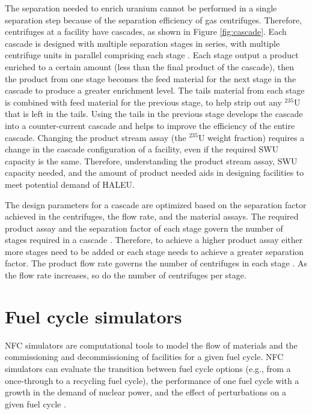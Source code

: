 The separation needed to enrich uranium cannot be performed 
in a single 
separation step because of the separation efficiency of gas centrifuges. 
Therefore, centrifuges at a facility have  
cascades, as shown in Figure \ref{fig:cascade}. Each cascade is designed with 
multiple separation stages in series, with multiple centrifuge units in 
parallel comprising each stage \cite{villani_uranium_1979}. Each stage 
output a product enriched to a certain 
amount (less than the final product of the cascade), then the product from 
one 
stage becomes the feed material for the next stage in the cascade to produce 
a greater enrichment level. The tails material from each 
stage is combined with feed material for the previous stage, to help strip 
out any $^{235}$U that is left in the tails. Using the tails in the 
previous stage develops the cascade into a counter-current cascade 
\cite{villani_uranium_1979} and helps to improve the efficiency of the entire cascade. 
Changing the product stream assay (the $^{235}$U weight fraction)
requires a change in the cascade configuration of 
a facility, even if the required \gls{SWU} capacity is the same. Therefore, 
understanding the product stream assay, \gls{SWU} capacity needed, and the 
amount of product needed aids in designing facilities to meet potential 
demand of \gls{HALEU}.



The design parameters for a cascade are optimized based on the separation 
factor 
achieved in the centrifuges, the flow rate, and the material assays. 
The required product assay and the separation factor of each stage govern 
the number of stages required in a cascade \cite{whitaker_uranium_2019}. 
Therefore, to achieve a higher product assay either more stages 
need to be added or each stage needs to achieve a greater separation
factor. The product flow rate governs the number of centrifuges in 
each stage \cite{whitaker_uranium_2019}. As the flow rate increases, 
so do the number of centrifuges per stage. 


%
%
%
\section{Fuel cycle simulators}
\gls{NFC} simulators are computational tools to model the flow of materials
and the commissioning and decommissioning of facilities for a given fuel 
cycle. \gls{NFC} simulators can evaluate the transition between fuel cycle 
options (e.g., from a once-through to a recycling fuel cycle), the 
performance of one fuel cycle with a growth in the demand of nuclear power, 
and the effect of perturbations on a given fuel cycle \cite{piet_dynamic_2011}. 


